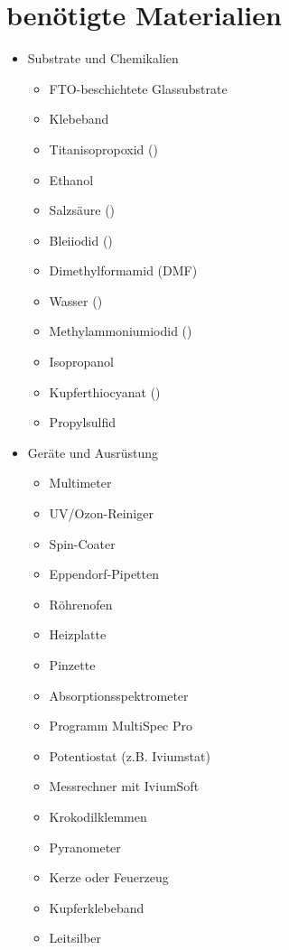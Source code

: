 \documentclass[12pt,a4paper,ngerman]{report}
\begin{document}
	\section[Materialien]{benötigte Materialien}
	{\small
		\begin{itemize}[itemsep=0pt, parsep=0pt] %
			\item Substrate und Chemikalien 
			\begin{itemize}[itemsep=0pt, parsep=0pt]
				\item FTO-beschichtete Glassubstrate
				\item Klebeband
				\item Titanisopropoxid ()
				\item Ethanol
				\item Salzsäure ()
				\item Bleiiodid ()
				\item Dimethylformamid (DMF)
				\item Wasser ()
				\item Methylammoniumiodid ()
				\item Isopropanol
				\item Kupferthiocyanat ()
				\item Propylsulfid
			\end{itemize}
		\item Geräte und Ausrüstung
			\begin{itemize}[itemsep=0pt, parsep=0pt]
				\item Multimeter
				\item UV/Ozon-Reiniger
				\item Spin-Coater
				\item Eppendorf-Pipetten
				\item Röhrenofen 
				\item Heizplatte
				\item Pinzette
				\item Absorptionsspektrometer
				\item Programm \glqq MultiSpec Pro\grqq
				\item Potentiostat (z.B. Iviumstat)
				\item Messrechner mit IviumSoft
				\item Krokodilklemmen
				\item Pyranometer
				\item Kerze oder Feuerzeug
				\item Kupferklebeband
				\item Leitsilber

\end{itemize}
\end{itemize}}
\end{document}
